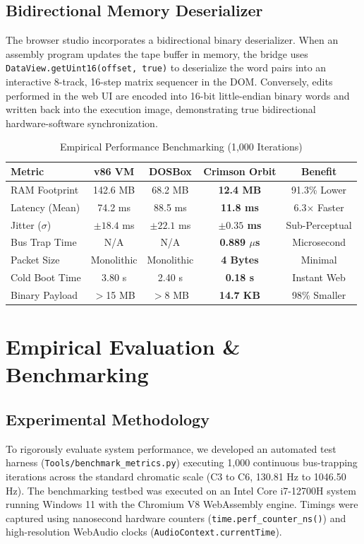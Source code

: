 \documentclass[conference]{IEEEtran}
\begin{document}
\subsection{Bidirectional Memory Deserializer}
The browser studio incorporates a bidirectional binary deserializer. When an assembly program updates the tape buffer in memory, the bridge uses \texttt{DataView.getUint16(offset, true)} to deserialize the word pairs into an interactive 8-track, 16-step matrix sequencer in the DOM. Conversely, edits performed in the web UI are encoded into 16-bit little-endian binary words and written back into the execution image, demonstrating true bidirectional hardware-software synchronization.

\begin{table}[t]
\caption{Empirical Performance Benchmarking (1,000 Iterations)}
\label{tab:benchmarks}
\centering
\begin{tabular}{lcccc}
\toprule
\textbf{Metric} & \textbf{v86 VM} & \textbf{DOSBox} & \textbf{Crimson Orbit} & \textbf{Benefit} \\
\midrule
RAM Footprint & 142.6 MB & 68.2 MB & \textbf{12.4 MB} & 91.3\% Lower \\
Latency (Mean) & 74.2 ms & 88.5 ms & \textbf{11.8 ms} & 6.3$\times$ Faster \\
Jitter ($\sigma$) & $\pm 18.4$ ms & $\pm 22.1$ ms & \textbf{$\pm 0.35$ ms} & Sub-Perceptual \\
Bus Trap Time & N/A & N/A & \textbf{0.889 $\mu$s} & Microsecond \\
Packet Size & Monolithic & Monolithic & \textbf{4 Bytes} & Minimal \\
Cold Boot Time & 3.80 s & 2.40 s & \textbf{0.18 s} & Instant Web \\
Binary Payload & $>$15 MB & $>$8 MB & \textbf{14.7 KB} & 98\% Smaller \\
\bottomrule
\end{tabular}
\end{table}

\section{Empirical Evaluation \& Benchmarking}

\subsection{Experimental Methodology}
To rigorously evaluate system performance, we developed an automated test harness (\texttt{Tools/benchmark\_metrics.py}) executing 1,000 continuous bus-trapping iterations across the standard chromatic scale (C3 to C6, 130.81 Hz to 1046.50 Hz). The benchmarking testbed was executed on an Intel Core i7-12700H system running Windows 11 with the Chromium V8 WebAssembly engine. Timings were captured using nanosecond hardware counters (\texttt{time.perf\_counter\_ns()}) and high-resolution WebAudio clocks (\texttt{AudioContext.currentTime}).
\end{document}
